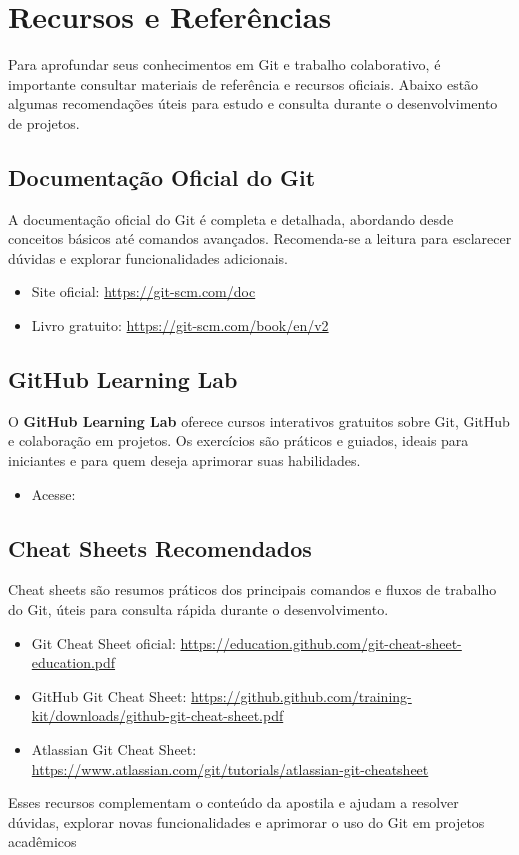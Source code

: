 \newpage
\section{Recursos e Referências}

Para aprofundar seus conhecimentos em Git e trabalho colaborativo, é importante consultar materiais de referência e recursos oficiais. Abaixo estão algumas recomendações úteis para estudo e consulta durante o desenvolvimento de projetos.

\subsection{Documentação Oficial do Git}

A documentação oficial do Git é completa e detalhada, abordando desde conceitos básicos até comandos avançados. Recomenda-se a leitura para esclarecer dúvidas e explorar funcionalidades adicionais.

\begin{itemize}
    \item Site oficial: \url{https://git-scm.com/doc}
    \item Livro gratuito: \url{https://git-scm.com/book/en/v2}
\end{itemize}

\subsection{GitHub Learning Lab}

O \textbf{GitHub Learning Lab} oferece cursos interativos gratuitos sobre Git, GitHub e colaboração em projetos. Os exercícios são práticos e guiados, ideais para iniciantes e para quem deseja aprimorar suas habilidades.


\begin{itemize}
    \item Acesse: 
\end{itemize}

\subsection{Cheat Sheets Recomendados}

Cheat sheets são resumos práticos dos principais comandos e fluxos de trabalho do Git, úteis para consulta rápida durante o desenvolvimento.

\begin{itemize}
    \item Git Cheat Sheet oficial: \url{https://education.github.com/git-cheat-sheet-education.pdf}
    \item GitHub Git Cheat Sheet: \url{https://github.github.com/training-kit/downloads/github-git-cheat-sheet.pdf}
    \item Atlassian Git Cheat Sheet: \url{https://www.atlassian.com/git/tutorials/atlassian-git-cheatsheet}
\end{itemize}

Esses recursos complementam o conteúdo da apostila e ajudam a resolver dúvidas, explorar novas funcionalidades e aprimorar o uso do Git em projetos acadêmicos